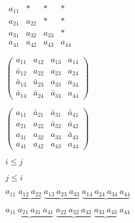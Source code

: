 {\newpage\clearpage
{}%
$
\begin{array}{cccc}
a_{11} &  \ast  &  \ast  &  \ast  \\
a_{21} & a_{22} &  \ast  &  \ast  \\
a_{31} & a_{32} & a_{33} &  \ast  \\
a_{41} & a_{42} & a_{43} & a_{44}
\end{array}
$%
\lthtmlinlinemathZ
\lthtmlcheckvsize\clearpage}

{\newpage\clearpage
{}%
$
\left( \begin{array}{cccc}
a_{11}       & a_{12}       & a_{13}       & a_{14} \\
\bar{a}_{12} & a_{22}       & a_{23}       & a_{24} \\
\bar{a}_{13} & \bar{a}_{23} & a_{33}       & a_{34} \\
\bar{a}_{14} & \bar{a}_{24} & \bar{a}_{34} & a_{44}
\end{array} \right)
$%
\lthtmlinlinemathZ
\lthtmlcheckvsize\clearpage}

{\newpage\clearpage
{}%
$
\left( \begin{array}{cccc}
a_{11} & \bar{a}_{21} & \bar{a}_{31} & \bar{a}_{41} \\
a_{21} & a_{22}       & \bar{a}_{32} & \bar{a}_{42} \\
a_{31} & a_{32}       & a_{33}       & \bar{a}_{43} \\
a_{41} & a_{42}       & a_{43}       & a_{44}
\end{array} \right)
$%
\lthtmlinlinemathZ
\lthtmlcheckvsize\clearpage}

{\newpage\clearpage
{}%
$i \leq j$%
\lthtmlinlinemathZ
\lthtmlcheckvsize\clearpage}

{\newpage\clearpage
{}%
$j \leq i$%
\lthtmlinlinemathZ
\lthtmlcheckvsize\clearpage}

{\newpage\clearpage
{}%
$
a_{11} \; \underbrace{a_{12} \: a_{22}} \;
\underbrace{a_{13} \: a_{23} \: a_{33}} \;
\underbrace{a_{14} \: a_{24} \: a_{34} \: a_{44}}
$%
\lthtmlinlinemathZ
\lthtmlcheckvsize\clearpage}

{\newpage\clearpage
{}%
$
\underbrace{a_{11} \: a_{21} \: a_{31} \: a_{41}} \;
\underbrace{a_{22} \: a_{32} \: a_{42}} \;
\underbrace{a_{33} \: a_{43}} \; a_{44}
$%
\lthtmlinlinemathZ
\lthtmlcheckvsize\clearpage}

